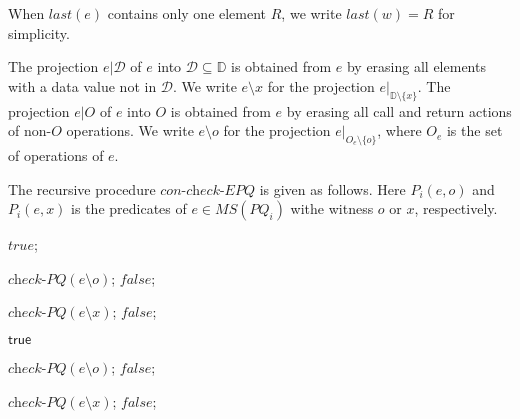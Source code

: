 When $\textit{last}(e)$ contains only one element $R$, we write $\textit{last}(w)=R$ for simplicity.

The projection $e \vert{\mathcal{D}}$ of $e$ into $\mathcal{D} \subseteq \mathbb{D}$ is obtained from $e$ by erasing all elements with a data value not in $\mathcal{D}$. We write $e \setminus x$ for the projection $e \vert_{ \mathbb{D} \setminus \{ x \} }$. The projection $e \vert{O}$ of $e$ into $O$ is obtained from $e$ by erasing all call and return actions of non-$O$ operations. We write $e \setminus o$ for the projection $e \vert_{ O_e \setminus \{ o \} }$, where $O_e$ is the set of operations of $e$.

The recursive procedure $\textit{con-check-EPQ}$ is given as follows. Here $P_i(e,o)$ and $P_i(e,x)$ is the predicates of $e \in \textit{MS}(\textit{PQ}_i)$ withe witness $o$ or $x$, respectively.

\begin{algorithm}[H]

{\KwRet $\textit{true}$;}

{
    {
        \KwRet $\textit{check-PQ}(e \setminus o)$;
    }
    \KwRet $\textit{false}$;
}

{
    {
        \KwRet $\textit{check-PQ}(e \setminus x)$;
    }
    \KwRet $\textit{false}$;
}
\caption{$\textit{check-PQ}$}
\label{Method-check-PQ}
\end{algorithm}

\begin{algorithm}[t]

{\Return $\mathsf{true}$\;}

{
    {
        \KwRet $\textit{check-PQ}(e \setminus o)$;
    }
    \KwRet $\textit{false}$;
}

{
    {
        \KwRet $\textit{check-PQ}(e \setminus x)$;
    }
    \KwRet $\textit{false}$;
}
\caption{$\textit{check-PQ}$}
\label{Method-check-PQ}
\end{algorithm}



